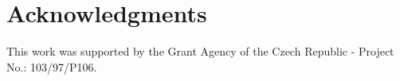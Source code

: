 \section*{Acknowledgments}
This work was supported by the Grant Agency of the Czech Republic -
Project No.: 103/97/P106.
